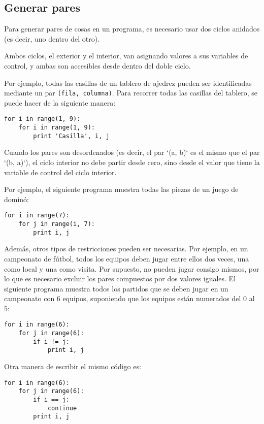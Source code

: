 \subsection{Generar pares}

Para generar pares de cosas en un programa, es necesario usar dos ciclos
anidados (es decir, uno dentro del otro).

Ambos ciclos, el exterior y el interior, van asignando valores a sus
variables de control, y ambas son accesibles desde dentro del doble
ciclo.

Por ejemplo, todas las casillas de un tablero de ajedrez pueden ser
identificadas mediante un par \lstinline!(fila, columna)!. Para recorrer
todas las casillas del tablero, se puede hacer de la siguiente manera:

\begin{lstlisting}
for i in range(1, 9):
    for i in range(1, 9):
        print 'Casilla', i, j
\end{lstlisting}

Cuando los pares son desordenados (es decir, el par `(a, b)` es el mismo
que el par `(b, a)`), el ciclo interior no debe partir desde cero, sino
desde el valor que tiene la variable de control del ciclo interior.

Por ejemplo, el siguiente programa muestra todas las piezas de un juego
de dominó:

\begin{lstlisting}
for i in range(7):
    for j in range(i, 7):
        print i, j
\end{lstlisting}

Además, otros tipos de restricciones pueden ser necesarias. Por ejemplo,
en un campeonato de fútbol, todos los equipos deben jugar entre ellos
dos veces, una como local y una como visita. Por supuesto, no pueden
jugar consigo mismos, por lo que es necesario excluir los pares
compuestos por dos valores iguales. El siguiente programa muestra todos
los partidos que se deben jugar en un campeonato con 6 equipos,
suponiendo que los equipos están numerados del 0 al 5:

\begin{lstlisting}
for i in range(6):
    for j in range(6):
        if i != j:
            print i, j
\end{lstlisting}

Otra manera de escribir el mismo código es:

\begin{lstlisting}
for i in range(6):
    for j in range(6):
        if i == j:
            continue
        print i, j
\end{lstlisting}

